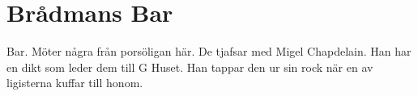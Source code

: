 \section{Brådmans Bar}
Bar. Möter några från porsöligan här. De tjafsar med Migel Chapdelain. Han har en dikt som leder dem till G Huset. Han tappar den ur sin rock när en av ligisterna kuffar till honom.
